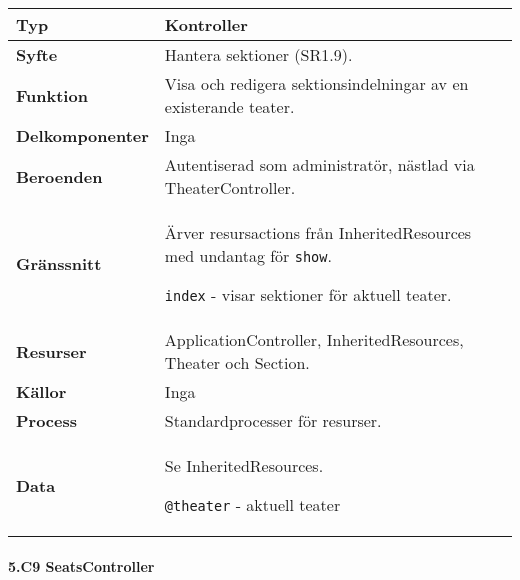 \documentclass[a4paper, twoside, 11pt, titlepage]{article}
\begin{document}
			\begin {table} [ht] \begin{tabular} {  p{3.5cm} p{11.6cm} }
				\hline
				{\sffamily\textbf{Typ}} & {Kontroller} \\
				\hline
				{\sffamily\textbf{Syfte}} & {Hantera sektioner (SR1.9).} \\
				\hline
				{\sffamily\textbf{Funktion}} & {Visa och redigera sektionsindelningar av en existerande teater.} \\
				\hline
				{\sffamily\textbf{Delkomponenter}} & {Inga} \\
				\hline
				{\sffamily\textbf{Beroenden}} & {Autentiserad som administratör, nästlad via TheaterController.} \\
				\hline
				{\sffamily\textbf{Gränssnitt}} & {Ärver resursactions från InheritedResources med undantag för {\tt show}.

{\tt index} - visar sektioner för aktuell teater.} \\
				\hline
				{\sffamily\textbf{Resurser}} & {ApplicationController, InheritedResources, Theater och Section.} \\
				\hline
				{\sffamily\textbf{Källor}} & {Inga} \\
				\hline
				{\sffamily\textbf{Process}} & {Standardprocesser för resurser.} \\
				\hline
				{\sffamily\textbf{Data}} & {Se InheritedResources.

{\tt @theater} - aktuell teater} \\
				\hline
			\end{tabular} \end{table} \FloatBarrier


			\clearpage %
			\paragraph{5.C9 SeatsController}\
\end{document}
